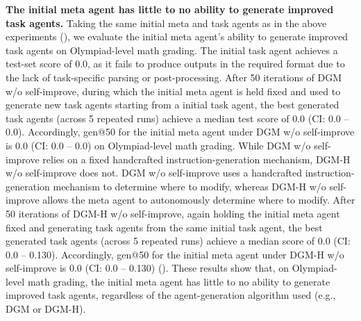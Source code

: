 \documentclass[]{fairmeta}
\begin{document}
\textbf{The initial meta agent has little to no ability to generate improved task agents.}
Taking the same initial meta and task agents as in the above experiments (), we evaluate the initial meta agent's ability to generate improved task agents on Olympiad-level math grading. The initial task agent achieves a test-set score of 0.0, as it fails to produce outputs in the required format due to the lack of task-specific parsing or post-processing.
After 50 iterations of DGM w/o self-improve, during which the initial meta agent is held fixed and used to generate new task agents starting from a initial task agent, the best generated task agents (across 5 repeated runs) achieve a median test score of 0.0 (CI: 0.0 – 0.0). Accordingly, gen@50 for the initial meta agent under DGM w/o self-improve is 0.0 (CI: 0.0 – 0.0) on Olympiad-level math grading.
While DGM w/o self-improve relies on a fixed handcrafted instruction-generation mechanism, DGM-H w/o self-improve does not.
DGM w/o self-improve uses a handcrafted instruction-generation mechanism to determine where to modify, whereas DGM-H w/o self-improve allows the meta agent to autonomously determine where to modify.
After 50 iterations of DGM-H w/o self-improve, again holding the initial meta agent fixed and generating task agents from the same initial task agent, the best generated task agents (across 5 repeated runs) achieve a median score of 0.0 (CI: 0.0 – 0.130). Accordingly, gen@50 for the initial meta agent under DGM-H w/o self-improve is 0.0 (CI: 0.0 – 0.130) ().
These results show that, on Olympiad-level math grading, the initial meta agent has little to no ability to generate improved task agents, regardless of the agent-generation algorithm used (e.g., DGM or DGM-H).
\end{document}
